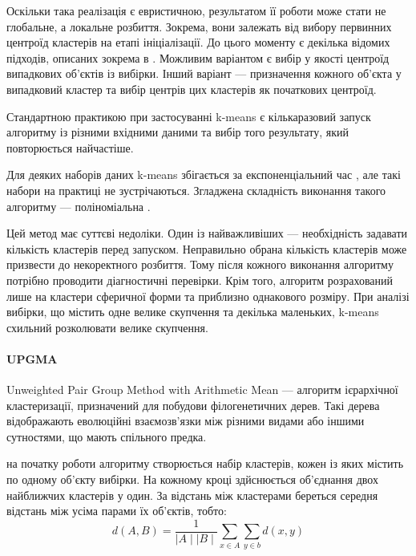            Оскільки така реалізація є евристичною, результатом її роботи може стати не глобальне, а локальне розбиття. Зокрема, вони залежать від вибору первинних центроїд кластерів на етапі ініціалізації. До цього моменту є декілька відомих підходів, описаних зокрема в \cite{HamerlyKMeansOptimization}. Можливим варіантом є вибір у якості центроїд випадкових об'єктів із вибірки. Інший варіант --- призначення кожного об'єкта у випадковий кластер та вибір центрів цих кластерів як початкових центроїд.
            
            Стандартною практикою при застосуванні k-means є кількаразовий запуск алгоритму із різними вхідними даними та вибір того результату, який повторюється найчастіше.
            
            Для деяких наборів даних k-means збігається за експоненціальний час \cite{KMeansWorstCaseComplexity}, але такі набори на практиці не зустрічаються. Згладжена складність виконання такого алгоритму --- поліноміальна \cite{KMeansSmoothedComplexity}. 
            
            Цей метод має суттєві недоліки. Один із найважливіших --- необхідність задавати кількість кластерів перед запуском. Неправильно обрана кількість кластерів може призвести до некоректного розбиття. Тому після кожного виконання алгоритму потрібно проводити діагностичні перевірки. Крім того, алгоритм розрахований лише на кластери сферичної форми та приблизно однакового розміру. При аналізі вибірки, що містить одне велике скупчення та декілька маленьких, k-means схильний розколювати велике скупчення.
            
        \paragraph {UPGMA}
            Unweighted Pair Group Method with Arithmetic Mean --- алгоритм ієрархічної кластеризації, призначений для побудови філогенетичних дерев. Такі дерева відображають еволюційні взаємозв'язки між різними видами або іншими сутностями, що мають спільного предка.
            
            на початку роботи алгоритму створюється набір кластерів, кожен із яких містить по одному об'єкту вибірки. На кожному кроці здйснюється об'єднання двох найближчих кластерів у один. За відстань між кластерами береться середня відстань між усіма парами їх об'єктів, тобто:
            \[
                d(A, B) = \frac{1}{\mid A \mid \mid B \mid} \sum_{x \in A} \sum_{y \in b} d(x, y)
            \]
            
